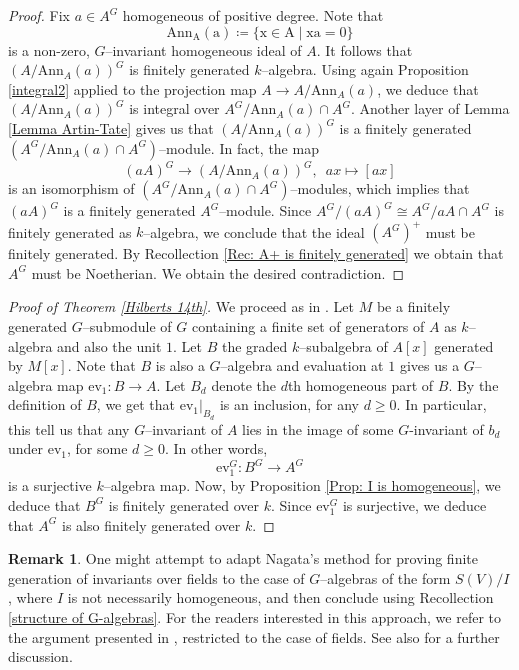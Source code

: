 \documentclass{article}
\theoremstyle{plain}
\theoremstyle{definition}
\newtheorem{Rem}[Th]{Remark}
\begin{document}
\begin{proof}
    Fix $a\in A^G$ homogeneous of positive degree. Note that 
    \[
    \mathrm{Ann_A(a)\coloneqq \{x\in A\mid xa=0\}}
    \]
    is a non-zero, $G$--invariant homogeneous ideal of $A$. It follows that $(A/\mathrm{Ann}_A(a))^G$ is finitely generated $k$--algebra. Using again Proposition \ref{integral2} applied to the projection map $A\to A/\mathrm{Ann}_A(a)$, we deduce that $(A/\mathrm{Ann}_A(a))^G$ is integral over $A^G/\mathrm{Ann}_A(a)\cap A^G$. Another layer of Lemma \ref{Lemma Artin-Tate} gives us that  $(A/\mathrm{Ann}_A(a))^G$ is a finitely generated $(A^G/\mathrm{Ann}_A(a)\cap A^G)$--module.  In fact, the map 
    \[
    (aA)^G \to  (A/\mathrm{Ann}_A(a))^G, \, \, \,  ax\mapsto [ax] 
    \]
    is an isomorphism of  $(A^G/\mathrm{Ann}_A(a)\cap A^G)$--modules, which implies that $(aA)^G$ is a finitely generated $A^G$--module. Since $A^G/(aA)^G\cong A^G/aA\cap A^G$ is finitely generated as $k$--algebra,  we conclude that the ideal $(A^G)^+$ must be finitely generated. By Recollection \ref{Rec: A+ is finitely generated} we obtain that $A^G$ must be Noetherian. We obtain the desired contradiction. 
\end{proof} 



\begin{proof}[Proof of Theorem \ref{Hilberts 14th}]
  We proceed as in \cite[Lemma 11]{van2021reductivity}. Let $M$ be a finitely generated $G$--submodule of $G$ containing a finite set of generators of $A$ as $k$--algebra and also the unit $1$. Let $B$ the graded $k$--subalgebra of $A[x]$ generated by $M[x]$. Note that $B$ is also a $G$--algebra and evaluation at $1$ gives us a $G$--algebra map  $\mathrm{ev}_1\colon B\to A$. Let $B_d$ denote the $d$th homogeneous part of $B$.  By the definition  of $B$, we get that  $\mathrm{ev}_1|_{B_d}$ is an inclusion, for any $d\geq0$. In particular, this tell us that any $G$--invariant of $A$ lies in the image of some $G$-invariant of $b_d$ under $\mathrm{ev}_1$, for some $d\geq 0$. In other words, 
  \[
  \mathrm{ev}_1^G\colon B^G\to A^G
  \]
  is a surjective $k$--algebra map. Now, by Proposition \ref{Prop: I is homogeneous}, we deduce that $B^G$ is finitely generated over $k$. Since $\mathrm{ev}_1^G$ is surjective, we deduce that $A^G$ is also finitely generated over $k$. 
\end{proof}

\begin{Rem}
  One might attempt to adapt Nagata’s method for proving finite generation of invariants over fields to the case of $G$--algebras of the form $S(V)/I$, where $I$ is not necessarily homogeneous, and then conclude using Recollection \ref{structure of G-algebras}. For the  readers interested in this approach, we refer to the argument  presented in \cite[Section 3.4]{Dolgachev}, restricted to the case of fields. See also \cite[Remark 9]{van2021reductivity} for a further discussion. 
\end{Rem}
\end{document}
